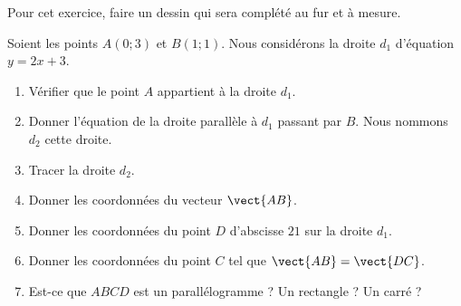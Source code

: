 
\begin{exercice}[\ldots/5]\label{exosmath-0694}

    Pour cet exercice, faire un dessin qui sera complété au fur et à mesure.

    Soient les points \( A(0;3)\) et \( B(1;1)\). Nous considérons la droite \( d_1\) d'équation \( y=2x+3\).
    \begin{multicols}{2}
    \begin{enumerate}
        \item
            Vérifier que le point \( A\) appartient à la droite \( d_1\).
        \item
            Donner l'équation de la droite parallèle à \( d_1\) passant par \( B\). Nous nommons \( d_2\) cette droite.
        \item
            Tracer la droite \( d_2\).
        \item
            Donner les coordonnées du vecteur \( \vect{ AB }\).
        \item
            Donner les coordonnées du point \( D\) d'abscisse \( 21\) sur la droite \( d_1\).
        \item
            Donner les coordonnées du point \( C\) tel que \( \vect{ AB }=\vect{ DC }\).
        \item
            Est-ce que \( ABCD\) est un parallélogramme ? Un rectangle ? Un carré ?
    \end{enumerate}
    \end{multicols}

\end{exercice}
